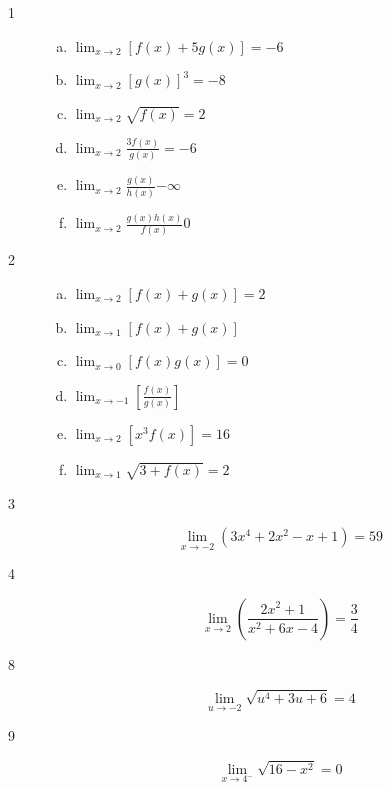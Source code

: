 \documentclass[letterpaper, landscape]{exam}
\begin{document}
    \begin{description}

      \item[1]
        \begin{enumerate}[(a)]
          \item $\lim_{x \to 2} \left[ f(x) + 5g(x) \right] = \boxed{ -6 }$
          \item $\lim_{x \to 2} \left[ g(x) \right]^3 = \boxed{ -8 }$
          \item $\lim_{x \to 2} \sqrt{f(x)} = \boxed{ 2 }$
          \item $\lim_{x \to 2} \frac{3 f(x)}{g(x)} = \boxed{ -6 }$
          \item $\lim_{x \to 2} \frac{g(x)}{h(x)} \boxed{ - \infty }$ 
          \item $\lim_{x \to 2} \frac{g(x) h(x)}{f(x)} \boxed{ 0 }$ 
        \end{enumerate}

      \item[2]
        \begin{enumerate}[(a)]
          \item $\lim_{x \to 2} \left[ f(x) + g(x) \right] = \boxed{ 2 }$
          \item $\lim_{x \to 1} \left[ f(x) + g(x) \right]$  
          \item $\lim_{x \to 0} \left[ f(x) g(x) \right] = \boxed{ 0 } $ 
          \item $\lim_{x \to -1} \left[ \frac{f(x)}{g(x)} \right]$ 
          \item $\lim_{x \to 2} \left[ x^3 f(x) \right] = \boxed{ 16 } $ 
          \item $\lim_{x \to 1} \sqrt{3 + f(x)} = \boxed{ 2 }$ 
        \end{enumerate}

      \item[3]
        \[
          \lim_{x \to -2} \left( 3x^4 + 2x^2 - x + 1 \right) = \boxed{ 59 }
        \]

      \item[4]
        \[
          \lim_{x \to 2} \left( \frac{2x^2 + 1}{x^2 + 6x - 4} \right) 
              = \boxed{ \frac{3}{4} }
        \]

      \item[8]
        \[
          \lim_{u \to -2} \sqrt{ u^4 + 3u + 6} = \boxed{ 4 }
        \]

      \item[9]
        \[
          \lim_{x \to 4^-} \sqrt{ 16 - x^2 } = \boxed{ 0 }
        \]


\end{description}
\end{document}
